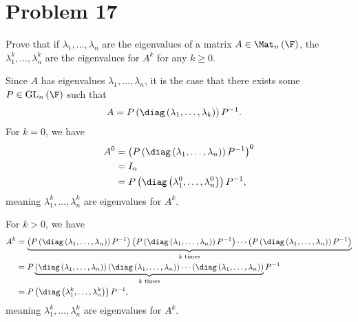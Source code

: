 \documentclass[8pt]{mypackage}
\begin{document}
\section{Problem 17}%
\begin{problem}
  Prove that if $\lambda_1,\dots,\lambda_n$ are the eigenvalues of a matrix $A\in \Mat_{n}\left(\F\right)$, the $\lambda_1^k,\dots,\lambda_n^{k}$ are the eigenvalues for $A^k$ for any $k\geq 0$.
\end{problem}
\begin{solution}
  Since $A$ has eigenvalues $\lambda_1,\dots,\lambda_n$, it is the case that there exists some $P\in \text{GL}_{n}\left(\F\right)$ such that
  \begin{align*}
    A &= P\left(\diag\left(\lambda_1,\dots,\lambda_k\right)\right)P^{-1}.
  \end{align*}
  For $k = 0$, we have
  \begin{align*}
    A^{0}  &= \left(P\left(\diag\left(\lambda_1,\dots,\lambda_n\right)\right)P^{-1}\right)^{0}\\
           &= I_n\\
           &= P\left(\diag\left(\lambda_1^{0},\dots,\lambda_n^{0}\right)\right)P^{-1},
  \end{align*}
  meaning $\lambda_1^k,\dots,\lambda_n^k$ are eigenvalues for $A^k$.\newline

  For $k > 0$, we have
  \begin{align*}
    A^{k} &= \underbrace{\left(P\left(\diag\left(\lambda_1,\dots,\lambda_n\right)\right)P^{-1}\right)\left(P\left(\diag\left(\lambda_1,\dots,\lambda_n\right)\right)P^{-1}\right)\cdots \left(P\left(\diag\left(\lambda_1,\dots,\lambda_n\right)\right)P^{-1}\right)}_{\text{$k$ times}}\\
          &= P\underbrace{\left(\diag\left(\lambda_1,\dots,\lambda_n\right)\right)\left(\diag\left(\lambda_1,\dots,\lambda_n\right)\right)\cdots\left(\diag\left(\lambda_1,\dots,\lambda_n\right)\right)}_{\text{$k$ times}}P^{-1}\\
          &= P\left(\diag\left(\lambda_1^{k},\dots,\lambda_n^{k}\right)\right)P^{-1},
  \end{align*}
  meaning $\lambda_1^k,\dots,\lambda_n^{k}$ are eigenvalues for $A^{k}$.
\end{solution}
\end{document}
